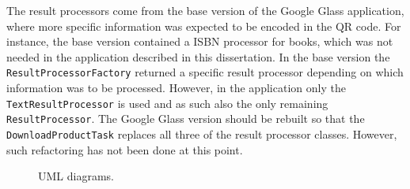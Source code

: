 The result processors come from the base version of the Google Glass application, where more specific information was expected to be encoded in the QR code. For instance, the base version contained a ISBN processor for books, which was not needed in the application described in this dissertation. In the base version the \texttt{ResultProcessorFactory} returned a specific result processor depending on which information was to be processed. However, in the application only the \texttt{TextResultProcessor} is used and as such also the only remaining \texttt{ResultProcessor}. The Google Glass version should be rebuilt so that the \texttt{DownloadProductTask} replaces all three of the result processor classes. However, such refactoring has not been done at this point. 


	\begin{figure}[ht!]
		\centering
   		 \qquad
   		 \qquad
		\caption{UML diagrams.}
		\label{umlDiagrams}
	\end{figure}
	
